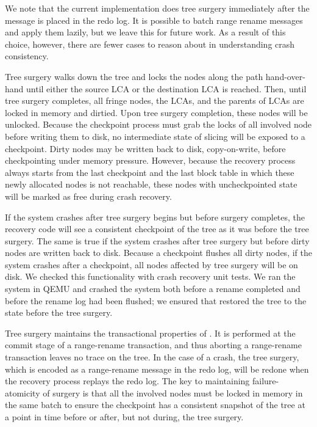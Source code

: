 We note that the current implementation does tree surgery immediately after the
message is placed in the redo log.
It is possible to batch range rename messages and apply them lazily,
but we leave this for future work.
As a result of this choice, however, there are fewer cases to reason about
in understanding crash consistency.

Tree surgery walks down the tree and locks the nodes along the path
hand-over-hand until either the source LCA or the destination LCA is reached.
Then, until tree surgery completes, all fringe nodes, the LCAs, and the parents
of LCAs are locked in memory and dirtied.
Upon tree surgery completion, these nodes will be unlocked.
Because the checkpoint process must grab the locks of all involved node before
writing them to disk,
no intermediate state of slicing will be exposed to a checkpoint.
Dirty nodes may be written back to disk, copy-on-write, before checkpointing
under memory pressure.
However, because the recovery process always starts from the last checkpoint and
the last block table in which these newly allocated nodes is not reachable,
these nodes with uncheckpointed state will be marked as free during crash
recovery.

If the system crashes after tree surgery begins but before surgery completes,
the recovery code will see a consistent checkpoint of the tree as it was
before the tree surgery.
The same is true if the system crashes after tree surgery but before dirty nodes
are written back to disk.
Because a checkpoint flushes all dirty nodes, if the system crashes after a
checkpoint, all nodes affected by tree surgery will be on disk.
We checked this functionality with crash recovery unit tests.
We ran the system in QEMU and crashed the system both before a rename completed
and before the rename log had been flushed;
we ensured that \betrfs restored the tree to the state before the tree surgery.

Tree surgery maintains the transactional properties of \betrfs.
It is performed at the commit stage of a range-rename transaction,
and thus aborting a range-rename transaction leaves no trace on the tree.
In the case of a crash, the tree surgery, which is encoded as a range-rename
message in the redo log, will be redone when the recovery process replays the
redo log.
The key to maintaining failure-atomicity of surgery is that all the involved
nodes must be locked in memory in the same batch to ensure the checkpoint has
a consistent snapshot of the tree at a point in time before or after,
but not during, the tree surgery.

